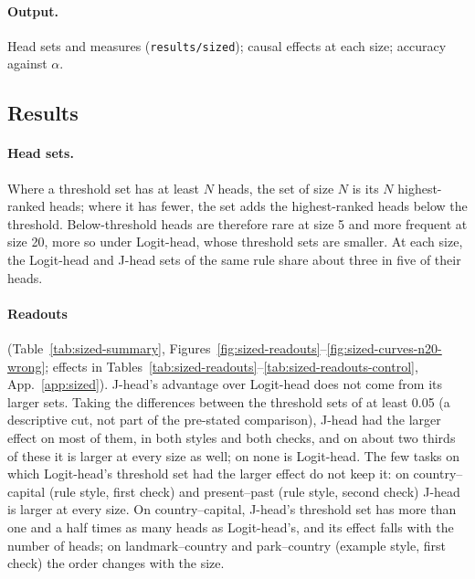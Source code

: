 \documentclass[11pt,a4paper]{article}
\begin{document}
\paragraph{Output.} Head sets and measures (\texttt{results/sized}); causal effects at each size; accuracy against $\alpha$.

\subsection{Results}\label{sec:res-sized}
\paragraph{Head sets.} Where a threshold set has at least $N$ heads, the set of size $N$ is its $N$ highest-ranked heads; where it has fewer, the set adds the highest-ranked heads below the threshold. Below-threshold heads are therefore rare at size 5 and more frequent at size 20, more so under Logit-head, whose threshold sets are smaller. At each size, the Logit-head and J-head sets of the same rule share about three in five of their heads.

\paragraph{Readouts} (Table~\ref{tab:sized-summary}, Figures~\ref{fig:sized-readouts}--\ref{fig:sized-curves-n20-wrong}; effects in Tables~\ref{tab:sized-readouts}--\ref{tab:sized-readouts-control}, App.~\ref{app:sized}). J-head's advantage over Logit-head does not come from its larger sets. Taking the differences between the threshold sets of at least 0.05 (a descriptive cut, not part of the pre-stated comparison), J-head had the larger effect on most of them, in both styles and both checks, and on about two thirds of these it is larger at every size as well; on none is Logit-head. The few tasks on which Logit-head's threshold set had the larger effect do not keep it: on country--capital (rule style, first check) and present--past (rule style, second check) J-head is larger at every size. On country--capital, J-head's threshold set has more than one and a half times as many heads as Logit-head's, and its effect falls with the number of heads; on landmark--country and park--country (example style, first check) the order changes with the size.
\end{document}
